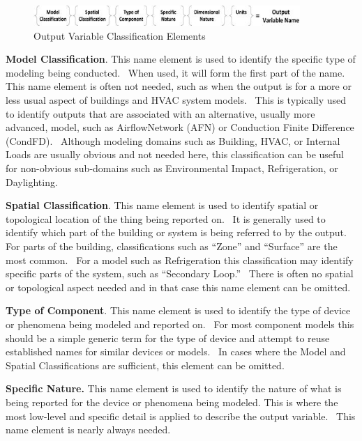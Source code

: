 \begin{figure}[hbtp] %
\centering
\includegraphics[width=0.9\textwidth, height=0.9\textheight, keepaspectratio=true]{media/image003.jpg}
\caption{Output Variable Classification Elements \protect \label{fig:output-variable-classification-elements}}
\end{figure}

\textbf{Model Classification}. This name element is used to identify the specific type of modeling being conducted.~ When used, it will form the first part of the name. This name element is often not needed, such as when the output is for a more or less usual aspect of buildings and HVAC system models.~ This is typically used to identify outputs that are associated with an alternative, usually more advanced, model, such as AirflowNetwork (AFN) or Conduction Finite Difference (CondFD).~ Although modeling domains such as Building, HVAC, or Internal Loads are usually obvious and not needed here, this classification can be useful for non-obvious sub-domains such as Environmental Impact, Refrigeration, or Daylighting.

\textbf{Spatial Classification}. This name element is used to identify spatial or topological location of the thing being reported on.~ It is generally used to identify which part of the building or system is being referred to by the output.~ For parts of the building, classifications such as ``Zone'' and ``Surface'' are the most common.~ For a model such as Refrigeration this classification may identify specific parts of the system, such as ``Secondary Loop.''~ There is often no spatial or topological aspect needed and in that case this name element can be omitted.

\textbf{Type of Component}. This name element is used to identify the type of device or phenomena being modeled and reported on.~ For most component models this should be a simple generic term for the type of device and attempt to reuse established names for similar devices or models.~ In cases where the Model and Spatial Classifications are sufficient, this element can be omitted.

\textbf{Specific Nature.} This name element is used to identify the nature of what is being reported for the device or phenomena being modeled. This is where the most low-level and specific detail is applied to describe the output variable.~ This name element is nearly always needed.

